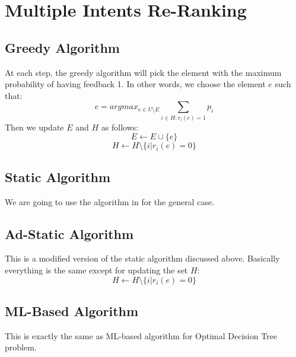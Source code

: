 \documentclass[12pt,epsfig,graphicx,amsmath,color]{article}
\newcommand{\ignore}[1]{}
\begin{document}
\section{Multiple Intents Re-Ranking}
\subsection{Greedy Algorithm}
At each step, the greedy algorithm will pick the element with the maximum probability of having feedback 1. In other words, we choose the element $e$ such that: 
$$e = argmax_{e\in U\setminus E}\sum_{i\in H: r_i(e)=1}p_i$$
Then we update $E$ and $H$ as follows:
$$E\leftarrow E\cup \{e\}$$
$$H\leftarrow H \setminus \{i|r_i(e)=0\}$$
\subsection{Static Algorithm}
We are going to use the algorithm in \cite{AGY09} for the general case. 

\begin{algorithm}[H]
\end{algorithm}

\ignore{that we have non-increasing weight. At each step we need to solve the relaxation of the following integer programming:
\begin{gather*}
\begin{aligned}
&\min\sum_{i\in H}y_i \\
y_i&\geq \sum_{e: r_i(e)=1}x_{\pi(e)}&\forall i\in H, \forall \pi\in \Pi\\
\sum_{e\in E'}x_e&\geq (|E'|+{|E'|}^2)/2&\forall E'\subseteq U\\
y_i&\in R^+&\forall i\in H\\
x_e&\in N&\forall e\in E
\end{aligned}
\end{gather*}}

\subsection{Ad-Static Algorithm}
This is a modified version of the static algorithm discussed above. Basically everything is the same except for updating the set $H$:
$$H\leftarrow H \setminus \{i|r_i(e)=0\}$$
\subsection{ML-Based Algorithm}
This is exactly the same as ML-based algorithm for Optimal Decision Tree problem.



\end{document}
